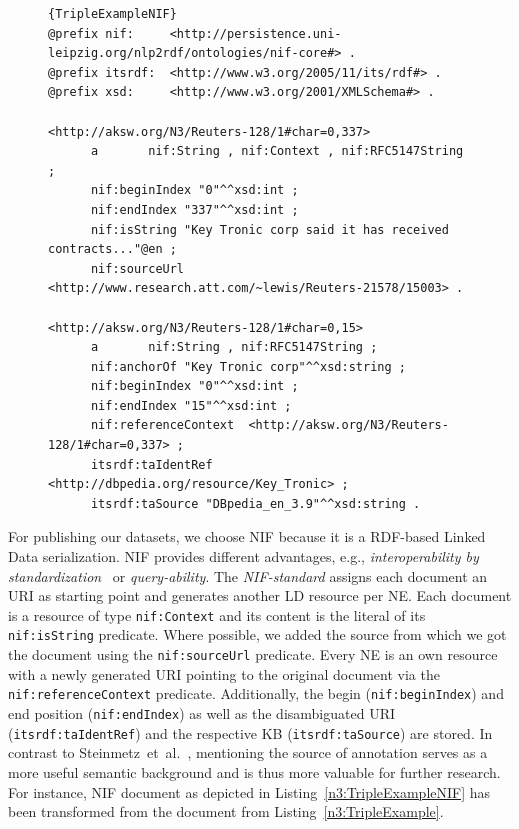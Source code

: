 \begin{figure}[htb!]
\begin{lstlisting}[label=n3:TripleExampleNIF,caption=Example of the resulting N3-triples.]{TripleExampleNIF}
@prefix nif:     <http://persistence.uni-leipzig.org/nlp2rdf/ontologies/nif-core#> .
@prefix itsrdf:  <http://www.w3.org/2005/11/its/rdf#> .
@prefix xsd:     <http://www.w3.org/2001/XMLSchema#> .

<http://aksw.org/N3/Reuters-128/1#char=0,337>
      a       nif:String , nif:Context , nif:RFC5147String ;
      nif:beginIndex "0"^^xsd:int ;
      nif:endIndex "337"^^xsd:int ;
      nif:isString "Key Tronic corp said it has received contracts..."@en ;
      nif:sourceUrl <http://www.research.att.com/~lewis/Reuters-21578/15003> .

<http://aksw.org/N3/Reuters-128/1#char=0,15>
      a       nif:String , nif:RFC5147String ;
      nif:anchorOf "Key Tronic corp"^^xsd:string ;
      nif:beginIndex "0"^^xsd:int ;
      nif:endIndex "15"^^xsd:int ;
      nif:referenceContext  <http://aksw.org/N3/Reuters-128/1#char=0,337> ;
      itsrdf:taIdentRef <http://dbpedia.org/resource/Key_Tronic> ;
      itsrdf:taSource "DBpedia_en_3.9"^^xsd:string .
\end{lstlisting}
\end{figure}




For publishing our datasets, we choose NIF because it is a \ac{RDF}-based Linked Data serialization.
NIF provides different advantages, e.g., \emph{interoperability by standardization}~\cite{ISWC2013NIF} or \emph{query-ability}.
The \emph{NIF-standard} assigns each document an URI as starting point and generates another \ac{LD}  resource per NE.
Each document is a resource of type \texttt{nif:Context} and its content is the literal of its \texttt{nif:isString} predicate. 
Where possible, we added the source from which we got the document using the \texttt{nif:sourceUrl} predicate.
Every NE is an own resource with a newly generated URI pointing to the original document via the \texttt{nif:referenceContext} predicate.
Additionally, the begin (\texttt{nif:beginIndex}) and end position (\texttt{nif:endIndex}) as well as the disambiguated URI (\texttt{itsrdf:taIdentRef}) and the respective \ac{KB}  (\texttt{itsrdf:taSource}) are stored.
In contrast to Steinmetz~et~al.~\cite{NEDstatBench}, mentioning the source of annotation serves as a more useful semantic background and is thus more valuable for further research.
For instance, NIF document as depicted in Listing~\ref{n3:TripleExampleNIF} has been transformed from the document from Listing~\ref{n3:TripleExample}.

